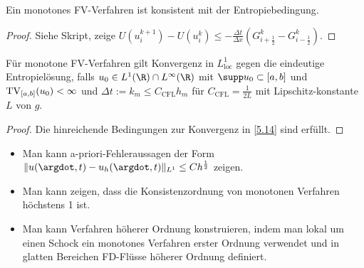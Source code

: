 \begin{st} \label{5.19}
    Ein monotones FV-Verfahren ist konsistent mit der Entropiebedingung.
    \begin{proof}
        Siehe Skript, zeige
        \begin{math}
            U(u_i^{k+1}) - U(u_i^k)
            \le - \frac{\Delta t}{\Delta x} (G_{i+\frac{1}{2}}^k - G_{i-\frac{1}{2}}^k).
        \end{math}
    \end{proof}
\end{st}

\begin{kor}[Konvergenz] \label{5.20}
    Für monotone FV-Verfahren gilt Konvergenz in $L^1_{\text{loc}}$ gegen die eindeutige Entropielösung, falls $u_0 \in L^1(\R) \cap L^\infty(\R)$ mit $\supp u_0 \subset [a,b]$ und $\operatorname{TV}_{[a,b]}(u_0) < \infty$ und $\Delta t := k_m \le C_{\text{CFL}} h_m$ für $C_{\text{CFL}} = \frac{1}{2L}$ mit Lipschitz-konstante $L$ von $g$.
    \begin{proof}
        Die hinreichende Bedingungen zur Konvergenz in \ref{5.14} sind erfüllt.
    \end{proof}
\end{kor}

\begin{note}
    \begin{itemize}
        \item
            Man kann a-priori-Fehleraussagen der Form
            \begin{math}
                \|u(\argdot, t) - u_h(\argdot, t)\|_{L^1} \le C h^{\frac{1}{2}}
            \end{math}
            zeigen.
        \item
            Man kann zeigen, dass die Konsistenzordnung von monotonen Verfahren höchstens 1 ist.
        \item
            Man kann Verfahren höherer Ordnung konstruieren, indem man lokal um einen Schock ein monotones Verfahren erster Ordnung verwendet und in glatten Bereichen FD-Flüsse höherer Ordnung definiert.
    \end{itemize}
\end{note}


